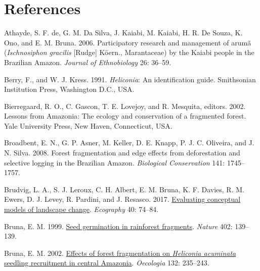 \documentclass[
  12pt,
  man, donotrepeattitle]{apa6}
\newlength{\cslhangindent}
\newlength{\cslentryspacingunit} %
\newenvironment{CSLReferences}[2] %
 {%
  \setlength{\parindent}{0pt}
  \ifodd #1
  \let\oldpar\par
  \def\par{\hangindent=\cslhangindent\oldpar}
  \fi
  \setlength{\parskip}{#2\cslentryspacingunit}
 }%
 {}
\begin{document}
\newpage

\hypertarget{references}{%
\section{References}\label{references}}

\begingroup
\setlength{\parindent}{0in}
\setlength{\leftskip}{0in}

\hypertarget{refs}{}
\begin{CSLReferences}{1}{0}
\leavevmode{}%
Athayde, S. F. de, G. M. Da Silva, J. Kaiabi, M. Kaiabi, H. R. De Souza, K. Ono, and E. M. Bruna. 2006. Participatory research and management of arumã (\emph{{Ischnosiphon} gracilis} {[}{Rudge}{]} {Köern}., {Marantaceae}) by the {Kaiabi} people in the {Brazilian} {Amazon}. \emph{Journal of Ethnobiology} 26: 36--59.

\leavevmode{}%
Berry, F., and W. J. Kress. 1991. \emph{Heliconia}: An identification guide. Smithsonian Institution Press, Washington D.C., USA.

\leavevmode{}%
Bierregaard, R. O., C. Gascon, T. E. Lovejoy, and R. Mesquita, editors. 2002. Lessons from {Amazonia}: The ecology and conservation of a fragmented forest. Yale University Press, New Haven, Connecticut, USA.

\leavevmode{}%
Broadbent, E. N., G. P. Asner, M. Keller, D. E. Knapp, P. J. C. Oliveira, and J. N. Silva. 2008. Forest fragmentation and edge effects from deforestation and selective logging in the {Brazilian} {Amazon}. \emph{Biological Conservation} 141: 1745--1757.

\leavevmode{}%
Brudvig, L. A., S. J. Leroux, C. H. Albert, E. M. Bruna, K. F. Davies, R. M. Ewers, D. J. Levey, R. Pardini, and J. Resasco. 2017. \href{https://doi.org/10.1111/ecog.02543}{Evaluating conceptual models of landscape change}. \emph{Ecography} 40: 74--84.

\leavevmode{}%
Bruna, E. M. 1999. \href{https://doi.org/10.1038/45963}{Seed germination in rainforest fragments}. \emph{Nature} 402: 139--139.

\leavevmode{}%
Bruna, E. M. 2002. \href{https://doi.org/10.1007/s00442-002-0956-y}{Effects of forest fragmentation on \emph{{Heliconia} acuminata} seedling recruitment in central {Amazonia}}. \emph{Oecologia} 132: 235--243.


\end{CSLReferences}
\end{document}
